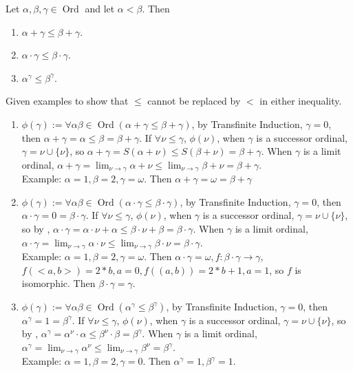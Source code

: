 \documentclass{ctexart}
\DeclareMathOperator{\ord}{Ord}
\begin{document}
\begin{problem}
Let $\alpha, \beta, \gamma \in\ord$ and let $\alpha<\beta$. Then
\begin{enumerate}[label=\alph*,ref=\theproblem.\alph*]
\item\label{it:11} $\alpha+\gamma \leq \beta+\gamma$.
\item\label{it:12} $\alpha \cdot \gamma \leq \beta \cdot \gamma$.
\item\label{it:13} $\alpha^\gamma \leq \beta^\gamma$.
\end{enumerate}
Given examples to show that $\leq$ cannot be replaced by $<$ in either inequality.
\end{problem}
\begin{solution}
    \begin{enumerate}
        \item $\phi(\gamma):=\forall \alpha \beta\in\ord(\alpha+\gamma \leq \beta+\gamma)$, by Transfinite Induction, $\gamma=0$, then $\alpha+\gamma =\alpha\le \beta= \beta+\gamma$. If $\forall \nu\le \gamma$, $\phi(\nu)$, when $\gamma$ is a successor ordinal, $\gamma=\nu\cup\{\nu\}$, so $\alpha+\gamma=S(\alpha+\nu)\leq S(\beta+\nu)=\beta+\gamma$. When $\gamma$ is a limit ordinal, $\alpha+\gamma=\lim_{\nu\to \gamma}\alpha+\nu\leq \lim_{\nu\to \gamma}\beta+\nu=\beta+\gamma$.\\
        Example: $\alpha=1,\beta=2,\gamma=\omega$. Then $\alpha+\gamma=\omega=\beta+\gamma$
        \item $\phi(\gamma):=\forall \alpha \beta\in\ord(\alpha\cdot\gamma \leq \beta\cdot\gamma)$, by Transfinite Induction, $\gamma=0$, then $\alpha\cdot\gamma =0=\beta\cdot\gamma$. If $\forall \nu\le \gamma$, $\phi(\nu)$, when $\gamma$ is a successor ordinal, $\gamma=\nu\cup\{\nu\}$, so by , $\alpha\cdot \gamma=\alpha\cdot \nu+\alpha\leq \beta\cdot \nu+\beta=\beta\cdot \gamma$. When $\gamma$ is a limit ordinal, $\alpha\cdot\gamma=\lim_{\nu\to \gamma}\alpha\cdot\nu\leq \lim_{\nu\to \gamma}\beta\cdot\nu=\beta\cdot\gamma$.\\
        Example: $\alpha=1,\beta=2,\gamma=\omega$. Then $\alpha\cdot \gamma=\omega, f: \beta\cdot \gamma\to \gamma$, $f(<a,b>)=2*b, a=0,f((a,b))=2*b+1, a=1$, so $f$ is isomorphic. Then $\beta\cdot \gamma=\gamma$.
        \item $\phi(\gamma):=\forall \alpha \beta\in\ord(\alpha^{\gamma} \leq \beta^{\gamma})$, by Transfinite Induction, $\gamma=0$, then $\alpha^{\gamma} =1=\beta^{\gamma}$. If $\forall \nu\le \gamma$, $\phi(\nu)$, when $\gamma$ is a successor ordinal, $\gamma=\nu\cup\{\nu\}$, so by , $\alpha^{ \gamma}=\alpha^{ \nu}\cdot\alpha\leq \beta^{ \nu}\cdot\beta=\beta^{ \gamma}$. When $\gamma$ is a limit ordinal, $\alpha^{\gamma}=\lim_{\nu\to \gamma}\alpha^{\nu}\leq \lim_{\nu\to \gamma}\beta^{\nu}=\beta^{\gamma}$.\\
        Example: $\alpha=1,\beta=2,\gamma=0$. Then $\alpha^\gamma=1,\beta^\gamma=1$.
    \end{enumerate}
\end{solution}
\end{document}

